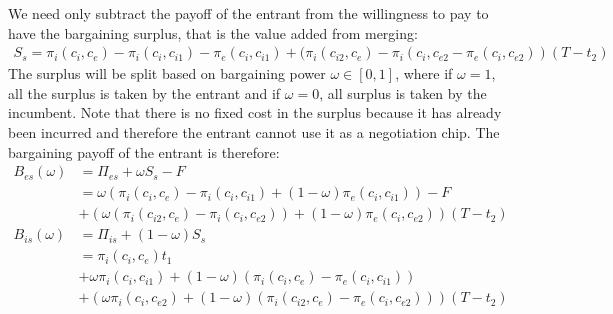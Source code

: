 \documentclass[12pt]{report}
\numberwithin{equation}{section}
\begin{document}
We need only subtract the payoff of the entrant from the willingness to pay to have the bargaining surplus, that is the value added from merging:
\begin{align*}
S_s= \pi_i(c_i,c_{e})-\pi_i(c_i,c_{i1})-\pi_e(c_i,c_{i1})+(\pi_i(c_{i2},c_e)-\pi_i(c_{i},c_{e2}-\pi_e(c_{i},c_{e2}))(T-t_2) 
\end{align*}
The surplus will be split based on bargaining power $\omega \in [0,1]$, where if $\omega = 1$, all the surplus is taken by the entrant and if $\omega = 0$, all surplus is taken by the incumbent. Note that there is no fixed cost in the surplus because it has already been incurred and therefore the entrant cannot use it as a negotiation chip. The bargaining payoff of the entrant is therefore:
\begin{align*}
B_{es}(\omega) &= \Pi_{es}+ \omega S_s -F \\
&=\omega(\pi_i(c_i,c_{e})-\pi_i(c_i,c_{i1})+(1-\omega)\pi_e(c_i,c_{i1}))-F \\
&+(\omega(\pi_i(c_{i2},c_e)- \pi_i(c_{i},c_{e2}))+(1-\omega)\pi_e(c_{i},c_{e2}))(T-t_2) \\
B_{is}(\omega) &= \Pi_{is}+(1-\omega)S_s \\
& =\pi_i(c_i,c_{e})t_1 \\
&+\omega \pi_i(c_i,c_{i1})+(1-\omega)(\pi_i(c_i,c_{e})-\pi_e(c_i,c_{i1}))
\\&+(\omega \pi_i(c_i,c_{e2})+(1-\omega)(\pi_i(c_{i2},c_e)-\pi_e(c_{i},c_{e2})))(T-t_2)
\end{align*}
\end{document}
